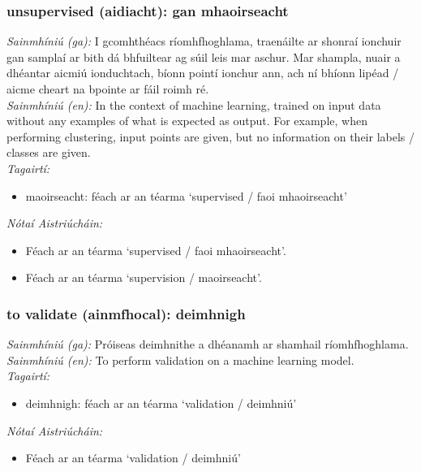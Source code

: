 \subsubsection*{unsupervised (aidiacht): gan mhaoirseacht}
 \noindent \textit{Sainmhíniú (ga):} I gcomhthéacs ríomhfhoghlama, traenáilte ar shonraí ionchuir gan samplaí ar bith dá bhfuiltear ag súil leis mar aschur. Mar shampla, nuair a dhéantar aicmiú ionduchtach, bíonn pointí ionchur ann, ach ní bhíonn lipéad / aicme cheart na bpointe ar fáil roimh ré.
\\
 \noindent \textit{Sainmhíniú (en):} In the context of machine learning, trained on input data without any examples of what is expected as output. For example, when performing clustering, input points are given, but no information on their labels / classes are given.
\\
 \noindent \textit{Tagairtí:}
\begin{itemize}
	\item maoirseacht: féach ar an téarma `supervised / faoi mhaoirseacht'
\end{itemize}

 \noindent \textit{Nótaí Aistriúcháin:}
\begin{itemize}
	\item Féach ar an téarma `supervised / faoi mhaoirseacht'.
	\item Féach ar an téarma `supervision / maoirseacht'.
\end{itemize}


\subsubsection*{to validate (ainmfhocal): deimhnigh}
 \noindent \textit{Sainmhíniú (ga):} Próiseas deimhnithe a dhéanamh ar shamhail ríomhfhoghlama.
\\
 \noindent \textit{Sainmhíniú (en):} To perform validation on a machine learning model.
\\
 \noindent \textit{Tagairtí:}
\begin{itemize}
	\item deimhnigh: féach ar an téarma `validation / deimhniú'
\end{itemize}

 \noindent \textit{Nótaí Aistriúcháin:}
\begin{itemize}
	\item Féach ar an téarma `validation / deimhniú'
\end{itemize}


